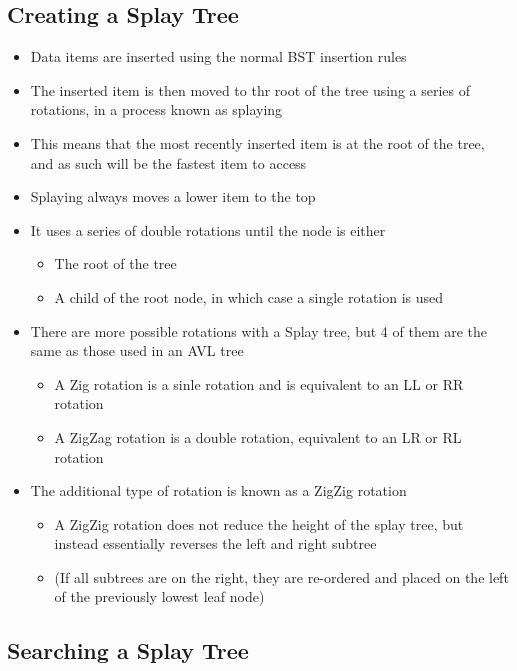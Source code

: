 \subsection*{Creating a Splay Tree}

\begin{itemize}
  \item Data items are inserted using the normal BST insertion rules
  \item The inserted item is then moved to thr root of the tree using a series of rotations, in a process known as splaying
  \item This means that the most recently inserted item is at the root of the tree, and as such will be the fastest item to access
  \item Splaying always moves a lower item to the top
  \item It uses a series of double rotations until the node is either
  \begin{itemize}
    \item The root of the tree
    \item A child of the root node, in which case a single rotation is used
  \end{itemize}
  \item There are more possible rotations with a Splay tree, but 4 of them are the same as those used in an AVL tree
  \begin{itemize}
    \item A Zig rotation is a sinle rotation and is equivalent to an LL or RR rotation
    \item A ZigZag rotation is a double rotation, equivalent to an LR or RL rotation
  \end{itemize}
  \item The additional type of rotation is known as a ZigZig rotation
  \begin{itemize}
    \item A ZigZig rotation does not reduce the height of the splay tree, but instead essentially reverses the left and right subtree
    \item (If all subtrees are on the right, they are re-ordered and placed on the left of the previously lowest leaf node)
  \end{itemize}
\end{itemize}

\subsection*{Searching a Splay Tree}

